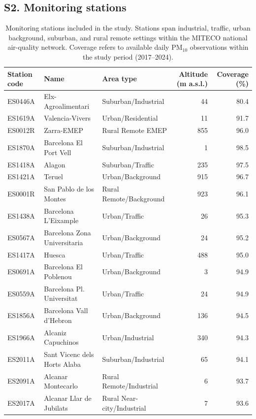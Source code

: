 \subsection*{S2. Monitoring stations}
\begin{table}[ht]
\centering
\small
\setlength{\tabcolsep}{3pt}
\caption{Monitoring stations included in the study. Stations span industrial,
  traffic, urban background, suburban, and rural remote settings within the
  MITECO national air-quality network. Coverage refers to available daily PM$_{10}$
  observations within the study period (2017--2024).}
\label{tab:stations-supp}
\begin{tabular}{@{}l>{\raggedright\arraybackslash}p{3.8cm}>{\raggedright\arraybackslash}p{3.3cm}rr@{}}
\hline
Station code & Name & Area type & Altitude (m a.s.l.) & Coverage (\%) \\
\hline
ES0446A & Elx-Agroalimentari & Suburban/Industrial & 44 & 80.4 \\
ES1619A & Valencia-Vivers & Urban/Residential & 11 & 91.7 \\
ES0012R & Zarra-EMEP & Rural Remote EMEP & 855 & 96.0 \\
ES1870A & Barcelona El Port Vell & Suburban/Industrial & 1 & 98.5 \\
ES1418A & Alagon & Suburban/Traffic & 235 & 97.5 \\
ES1421A & Teruel & Urban/Background & 915 & 96.7 \\
ES0001R & San Pablo de los Montes & Rural Remote/Background & 923 & 96.1 \\
ES1438A & Barcelona L'Eixample & Urban/Traffic & 26 & 95.3 \\
ES0567A & Barcelona Zona Universitaria & Urban/Background & 24 & 95.2 \\
ES1417A & Huesca & Urban/Traffic & 488 & 95.0 \\
ES0691A & Barcelona El Poblenou & Urban/Background & 3 & 94.9 \\
ES0559A & Barcelona Pl. Universitat & Urban/Traffic & 24 & 94.9 \\
ES1856A & Barcelona Vall d'Hebron & Urban/Background & 136 & 94.5 \\
ES1966A & Alcaniz Capuchinos & Urban/Industrial & 340 & 94.3 \\
ES2011A & Sant Vicenc dels Horts Alaba & Suburban/Industrial & 65 & 94.1 \\
ES2091A & Alcanar Montecarlo & Rural Remote/Industrial & 6 & 93.7 \\
ES2017A & Alcanar Llar de Jubilats & Rural Near-city/Industrial & 7 & 93.6 \\
\hline
\end{tabular}
\end{table}
